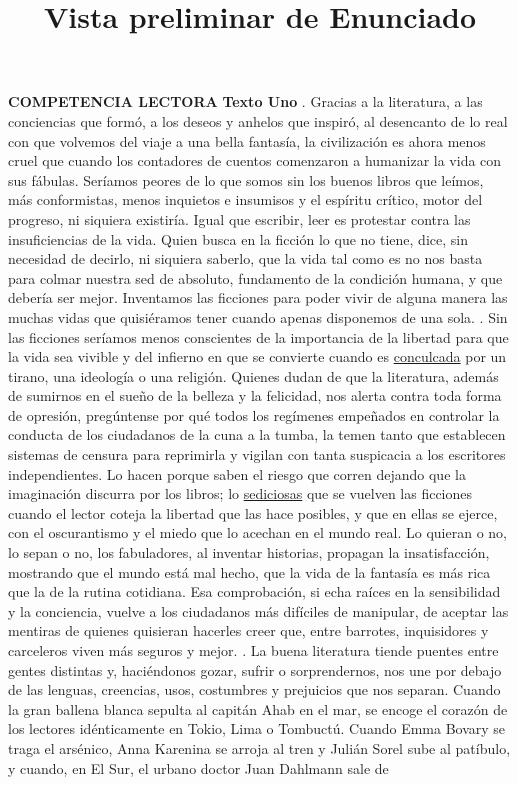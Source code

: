 \documentclass[a4paper,10pt]{article}\usepackage[utf8]{inputenc}\usepackage[spanish]{babel}\usepackage{times}
\title{Vista preliminar de Enunciado}
\begin{document}
\twocolumn 

\maketitle

\textbf{ COMPETENCIA LECTORA } \newline \textbf{ Texto Uno} . Gracias a la literatura, a las conciencias que formó, a los deseos y anhelos que inspiró, al desencanto de lo real con que volvemos del viaje a una bella fantasía, la civilización es ahora menos cruel que cuando los contadores de cuentos comenzaron a humanizar la vida con sus fábulas. Seríamos peores de lo que somos sin los buenos libros que leímos, más conformistas, menos inquietos e insumisos y el espíritu crítico, motor del progreso, ni siquiera existiría. Igual que escribir, leer es protestar contra las insuficiencias de la vida. Quien busca en la ficción lo que no tiene, dice, sin necesidad de decirlo, ni siquiera saberlo, que la vida tal como es no nos basta para colmar nuestra sed de absoluto, fundamento de la condición humana, y que debería ser mejor. Inventamos las ficciones para poder vivir de alguna manera las muchas vidas que quisiéramos tener cuando apenas disponemos de una sola. . Sin las ficciones seríamos menos conscientes de la importancia de la libertad para que la vida sea vivible y del infierno en que se convierte cuando es \underline{ conculcada}  por un tirano, una ideología o una religión. Quienes dudan de que la literatura, además de sumirnos en el sueño de la belleza y la felicidad, nos alerta contra toda forma de opresión, pregúntense por qué todos los regímenes empeñados en controlar la conducta de los ciudadanos de la cuna a la tumba, la temen tanto que establecen sistemas de censura para reprimirla y vigilan con tanta suspicacia a los escritores independientes. Lo hacen porque saben el riesgo que corren dejando que la imaginación discurra por los libros; lo \underline{ sediciosas}  que se vuelven las ficciones cuando el lector coteja la libertad que las hace posibles, y que en ellas se ejerce, con el oscurantismo y el miedo que lo acechan en el mundo real. Lo quieran o no, lo sepan o no, los fabuladores, al inventar historias, propagan la insatisfacción, mostrando que el mundo está mal hecho, que la vida de la fantasía es más rica que la de la rutina cotidiana. Esa comprobación, si echa raíces en la sensibilidad y la conciencia, vuelve a los ciudadanos más difíciles de manipular, de aceptar las mentiras de quienes quisieran hacerles creer que, entre barrotes, inquisidores y carceleros viven más seguros y mejor. . La buena literatura tiende puentes entre gentes distintas y, haciéndonos gozar, sufrir o sorprendernos, nos une por debajo de las lenguas, creencias, usos, costumbres y prejuicios que nos separan. Cuando la gran ballena blanca sepulta al capitán Ahab en el mar, se encoge el corazón de los lectores idénticamente en Tokio, Lima o Tombuctú. Cuando Emma Bovary se traga el arsénico, Anna Karenina se arroja al tren y Julián Sorel sube al patíbulo, y cuando, en El Sur, el urbano doctor Juan Dahlmann sale de 
\end{document}
